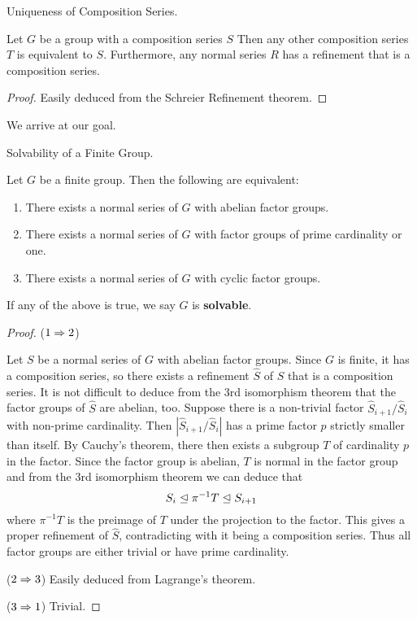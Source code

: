 \documentclass[../../book.tex]{subfiles}
\begin{document}
\begin{thm} Uniqueness of Composition Series.
    
    Let $G$ be a group with a composition series $S$
    Then any other composition series $T$ is equivalent to $S$.
    Furthermore, any normal series $R$ has a refinement that is a composition series.
    
\end{thm}
\begin{proof}
    
    Easily deduced from the Schreier Refinement theorem.
    
\end{proof}

We arrive at our goal.

\begin{dfn} Solvability of a Finite Group.
    
    Let $G$ be a finite group.
    Then the following are equivalent: \begin{enumerate}
        \item There exists a normal series of $G$ with abelian factor groups.
        \item There exists a normal series of $G$ 
        with factor groups of prime cardinality or one.
        \item There exists a normal series of $G$ with cyclic factor groups.
    \end{enumerate}
    If any of the above is true, we say $G$ is \textbf{solvable}. 
    
\end{dfn}
\begin{proof}
    
    ($1 \Rightarrow 2$)
        
        Let $S$ be a normal series of $G$ with abelian factor groups.
        Since $G$ is finite, it has a composition series,
        so there exists a refinement $\hat{S}$ of $S$ that is a composition series.
        It is not difficult to deduce from the 3rd isomorphism theorem
        that the factor groups of $\hat{S}$ are abelian, too.
        Suppose there is a non-trivial factor $\hat{S}_{i+1} / \hat{S}_i$ 
        with non-prime cardinality. 
        Then $|\hat{S}_{i+1} / \hat{S}_i|$ has a prime factor $p$ 
        strictly smaller than itself. 
        By Cauchy's theorem, 
        there then exists a subgroup $T$ of cardinality $p$ in the factor.
        Since the factor group is abelian, $T$ is normal in the factor group
        and from the 3rd isomorphism theorem we can deduce that \[
            S_i \trianglelefteq \pi^{-1} T \trianglelefteq S_{i+1}
        \]
        where $\pi^{-1} T$ is the preimage of $T$ under the projection to the factor.
        This gives a proper refinement of $\hat{S}$, 
        contradicting with it being a composition series. 
        Thus all factor groups are either trivial or have prime cardinality. 
        
    ($2 \Rightarrow 3$) Easily deduced from Lagrange's theorem.
    
    ($3 \Rightarrow 1$) Trivial.
\end{proof}
\end{document}
